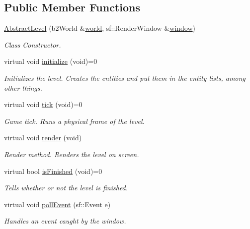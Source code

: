 \subsection*{Public Member Functions}
\begin{DoxyCompactItemize}
\item 
\hyperlink{class_abstract_level_a1557b99aa039a0fd5ceb7120306384a1}{Abstract\+Level} (b2\+World \&\hyperlink{class_abstract_level_a566499434bbd056afd9e12b971e8a41e}{world}, sf\+::\+Render\+Window \&\hyperlink{class_abstract_level_a3332e1be17da924be26064ac4e089721}{window})
\begin{DoxyCompactList}\small\item\em Class Constructor. \end{DoxyCompactList}\item 
virtual void \hyperlink{class_abstract_level_aaac7519d2d31d8db995585dec4f5aec0}{initialize} (void)=0
\begin{DoxyCompactList}\small\item\em Initializes the level. Creates the entities and put them in the entity lists, among other things. \end{DoxyCompactList}\item 
virtual void \hyperlink{class_abstract_level_ac50b3069600e90000f2f62dccb522154}{tick} (void)=0
\begin{DoxyCompactList}\small\item\em Game tick. Runs a physical frame of the level. \end{DoxyCompactList}\item 
virtual void \hyperlink{class_abstract_level_aa64f9c76abab71339dc07643472f13ee}{render} (void)
\begin{DoxyCompactList}\small\item\em Render method. Renders the level on screen. \end{DoxyCompactList}\item 
virtual bool \hyperlink{class_abstract_level_a1dbffd34c5ebd93ff833aa6a23047546}{is\+Finished} (void)=0
\begin{DoxyCompactList}\small\item\em Tells whether or not the level is finished. \end{DoxyCompactList}\item 
virtual void \hyperlink{class_abstract_level_aa6b84b35f24206c43bb7cc0af1f9dfb5}{poll\+Event} (sf\+::\+Event e)
\begin{DoxyCompactList}\small\item\em Handles an event caught by the window. \end{DoxyCompactList}\end{DoxyCompactItemize}
